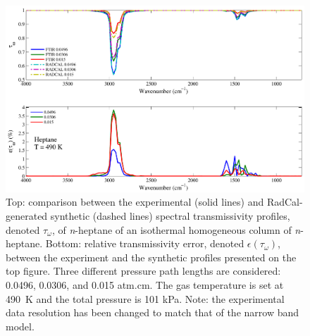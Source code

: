 \begin{figure}[p]
\includegraphics[width=\textwidth]{../Verification/Results_Test2/Heptane_490.pdf}
\caption{Top: comparison between the experimental (solid lines) and RadCal-generated synthetic (dashed lines) spectral transmissivity profiles, denoted $\tau_{\omega}$, of \textit{n}-heptane of an isothermal homogeneous column of \textit{n}-heptane. Bottom: relative transmissivity error, denoted $\epsilon{(\tau_{\omega})}$, between the experiment and the synthetic profiles presented on the top figure. Three different pressure path lengths are considered: 0.0496, 0.0306, and 0.015 atm.cm. The gas temperature is set at 490~K and the total pressure is 101 kPa. Note: the experimental data resolution has been changed to match that of the narrow band model. \label{fig:nheptane_Verify_490K}}
\end{figure}

